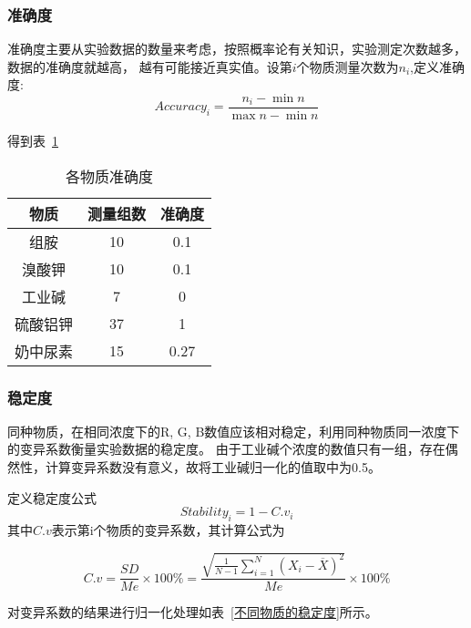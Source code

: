     \subsubsection{准确度}
    准确度主要从实验数据的数量来考虑，按照概率论有关知识，实验测定次数越多，数据的准确度就越高，
    越有可能接近真实值。设第$i$个物质测量次数为$n_{i}$,定义准确度:
    $$Accuracy_i=\frac{n_i -\min n}{\max n-\min n}$$
    
    得到表~\ref{各物质准确度}
    
    \begin{table}[H]
      \centering
      \caption{各物质准确度}
      \label{各物质准确度}
      \begin{tabular}{@{}ccc@{}}
      \toprule
      物质 & 测量组数  & 准确度 \\ \midrule
      组胺 & 10 & 0.1   \\    \bottomrule
      溴酸钾 & 10 & 0.1  \\    \bottomrule
      工业碱 & 7 & 0     \\      \bottomrule
      硫酸铝钾 & 37 & 1   \\     \bottomrule
      奶中尿素 & 15 & 0.27 \\    \bottomrule
      \end{tabular}
    \end{table}
    
    \subsubsection{稳定度}
    同种物质，在相同浓度下的R, G, B数值应该相对稳定，利用同种物质同一浓度下的变异系数衡量实验数据的稳定度。
    由于工业碱个浓度的数值只有一组，存在偶然性，计算变异系数没有意义，故将工业碱归一化的值取中为0.5。

    定义稳定度公式
    $$Stability_i=1-{C.v}_i$$
    其中$C.v$表示第i个物质的变异系数，其计算公式为

    $$C.v = \frac{SD}{Me} \times 100\% = 
    \frac{\sqrt{\frac{1}{N - 1} \sum_{i=1}^{N} (X_{i} - \overline{X})^2 }} {Me} \times 100\%$$

    对变异系数的结果进行归一化处理如表~\ref{不同物质的稳定度}所示。
    
